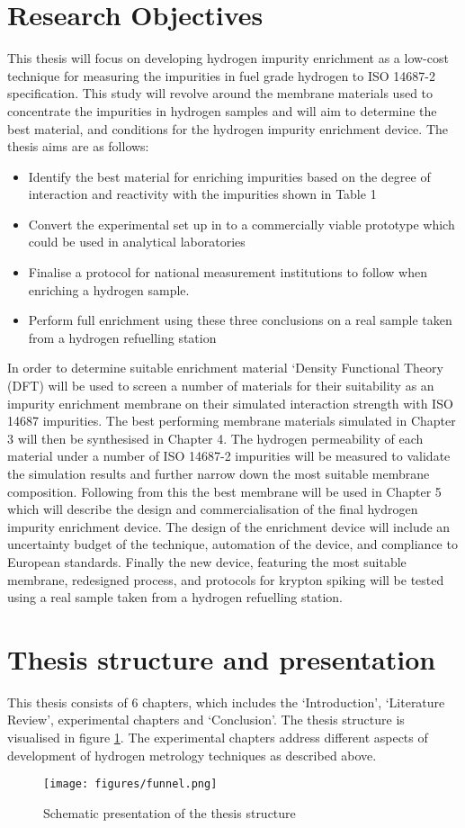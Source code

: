 \section{Research Objectives}
This thesis will focus on developing hydrogen impurity enrichment as a low-cost technique for measuring 
the impurities in fuel grade hydrogen to ISO 14687-2 specification. 
This study will revolve around the membrane materials used to concentrate the impurities in hydrogen samples 
and will aim to determine the best material, and conditions for the hydrogen impurity enrichment device. 
The thesis aims are as follows:
\begin{itemize}
\item Identify the best material for enriching impurities based on the degree of interaction and reactivity with the impurities shown in Table 1 
\item Convert the experimental set up in to a commercially viable prototype which could be used in analytical laboratories
\item Finalise a protocol for national measurement institutions to follow when enriching a hydrogen sample. 
\item Perform full enrichment using these three conclusions on a real sample taken from a hydrogen refuelling station
\end{itemize}
In order to determine suitable enrichment material ‘Density Functional Theory (DFT) will be used to screen 
a number of materials for their suitability as an impurity enrichment membrane on their simulated 
interaction strength with ISO 14687 impurities. 
The best performing membrane materials simulated in Chapter 3 will then be synthesised in Chapter 4. 
The hydrogen permeability of each material under a number of ISO 14687-2 impurities will be measured to 
validate the simulation results and further narrow down the most suitable membrane composition. 
Following from this the best membrane will be used in Chapter 5 which will describe the design and 
commercialisation of the final hydrogen impurity enrichment device. The design of the enrichment device 
will include an uncertainty budget of the technique, automation of the device, and compliance to European 
standards.
Finally the new device, featuring the most suitable membrane, redesigned process, and protocols for krypton 
spiking will be tested using a real sample taken from a hydrogen refuelling station.


\section{Thesis structure and presentation}
This thesis consists of 6 chapters, which includes the ‘Introduction’, ‘Literature Review’, 
experimental chapters and ‘Conclusion’. The thesis structure is visualised in figure \ref{fig:1}. 
The experimental chapters address different aspects of development of hydrogen metrology techniques as 
described above. 


\begin{figure}
  \texttt{[image: figures/funnel.png]}
  \caption{Schematic presentation of the thesis structure}
  \label{fig:1}
\end{figure}


\renewcommand{\bibname}{References}

